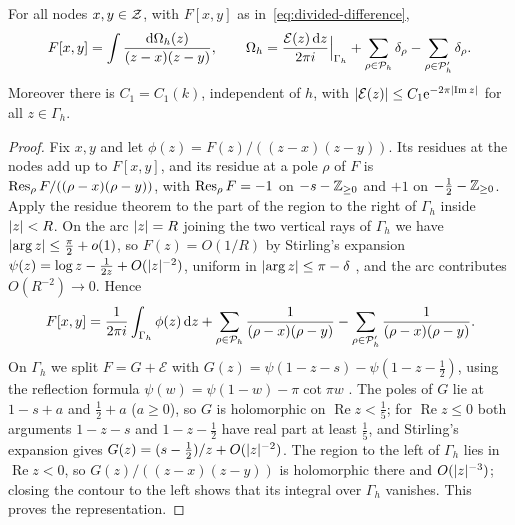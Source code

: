 \begin{lemma}\label{lem:contour}
For all nodes $x,y\in\mathcal{Z}$, with $F[x,y]$ as in~\eqref{eq:divided-difference},
\[
  F[x,y]=\int\frac{\mathrm{d}\Omega_h(z)}{(z-x)(z-y)},\qquad
  \Omega_h=\frac{\mathcal E(z)\,\mathrm{d} z}{2\pi i}\Big|_{\Gamma_h}
           +\sum_{\rho\in\mathcal{P}_h}\delta_\rho-\sum_{\rho\in\mathcal{P}'_h}\delta_\rho .
\]
Moreover there is $C_1=C_1(k)$, independent of $h$, with
$\lvert \mathcal E(z)\rvert\le C_1\mathrm{e}^{-2\pi\lvert \operatorname{Im}z\rvert}$ for all $z\in\Gamma_h$.
\end{lemma}

\begin{proof}
Fix $x,y$ and let $\phi(z)=F(z)/((z-x)(z-y))$. Its residues at the nodes add up to $F[x,y]$, and
its residue at a pole $\rho$ of $F$ is $\operatorname{Res}_\rho F/((\rho-x)(\rho-y))$, with $\operatorname{Res}_\rho F=-1$ on
$-s-\mathbb{Z}_{\ge0}$ and $+1$ on $-\frac12-\mathbb{Z}_{\ge0}$. Apply the residue theorem to the part of the
region to the right of $\Gamma_h$ inside $\lvert z\rvert<R$. On the arc $\lvert z\rvert=R$ joining the two vertical
rays of $\Gamma_h$ we have $\lvert \arg z\rvert\le\frac\pi2+o(1)$, so $F(z)=O(1/R)$ by Stirling's
expansion $\psi(z)=\log z-\frac1{2z}+O(\lvert z\rvert^{-2})$, uniform in $\lvert \arg z\rvert\le\pi-\delta$
\cite[5.11.2]{DLMF}, and the arc contributes $O(R^{-2})\to0$. Hence
\[
  F[x,y]=\frac1{2\pi i}\int_{\Gamma_h}\phi(z)\,\mathrm{d} z
  +\sum_{\rho\in\mathcal{P}_h}\frac1{(\rho-x)(\rho-y)}-\sum_{\rho\in\mathcal{P}'_h}\frac1{(\rho-x)(\rho-y)} .
\]
On $\Gamma_h$ we split $F=G+\mathcal E$ with $G(z)=\psi(1-z-s)-\psi(1-z-\frac12)$, using the
reflection formula $\psi(w)=\psi(1-w)-\pi\cot\pi w$ \cite[5.5.4]{DLMF}. The poles of $G$ lie at
$1-s+a$ and $\frac12+a$ ($a\ge0$), so $G$ is holomorphic on $\operatorname{Re}z<\frac15$; for
$\operatorname{Re}z\le0$ both arguments $1-z-s$ and $1-z-\frac12$ have real part at least
$\frac15$, and Stirling's expansion gives $G(z)=(s-\frac12)/z+O(\lvert z\rvert^{-2})$. The region to the
left of $\Gamma_h$ lies in $\operatorname{Re}z<0$, so $G(z)/((z-x)(z-y))$ is holomorphic there
and $O(\lvert z\rvert^{-3})$; closing the contour to the left shows that its integral over $\Gamma_h$
vanishes. This proves the representation.


\end{proof}

